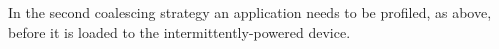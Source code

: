 In the second coalescing strategy an application needs to be profiled, as above, before it is loaded to the intermittently-powered device.


%
%
%
%
%
%
%
%

